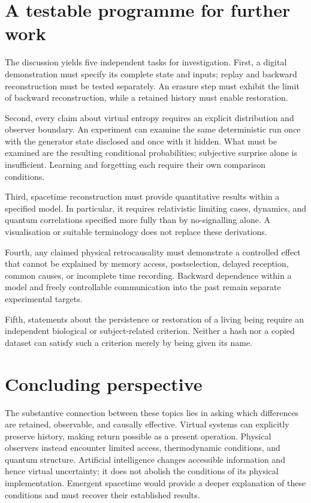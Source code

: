 \section{A testable programme for further work}\label{en:sec12}
The discussion yields five independent tasks for investigation. First, a digital demonstration must specify its complete state and inputs; replay and backward reconstruction must be tested separately. An erasure step must exhibit the limit of backward reconstruction, while a retained history must enable restoration.

Second, every claim about virtual entropy requires an explicit distribution and observer boundary. An experiment can examine the same deterministic run once with the generator state disclosed and once with it hidden. What must be examined are the resulting conditional probabilities; subjective surprise alone is insufficient. Learning and forgetting each require their own comparison conditions.

Third, spacetime reconstruction must provide quantitative results within a specified model. In particular, it requires relativistic limiting cases, dynamics, and quantum correlations specified more fully than by no-signalling alone. A visualisation or suitable terminology does not replace these derivations.

Fourth, any claimed physical retrocausality must demonstrate a controlled effect that cannot be explained by memory access, postselection, delayed reception, common causes, or incomplete time recording. Backward dependence within a model and freely controllable communication into the past remain separate experimental targets.

Fifth, statements about the persistence or restoration of a living being require an independent biological or subject-related criterion. Neither a hash nor a copied dataset can satisfy such a criterion merely by being given its name.

\section{Concluding perspective}\label{en:sec13}
The substantive connection between these topics lies in asking which differences are retained, observable, and causally effective. Virtual systems can explicitly preserve history, making return possible as a present operation. Physical observers instead encounter limited access, thermodynamic conditions, and quantum structure. Artificial intelligence changes accessible information and hence virtual uncertainty; it does not abolish the conditions of its physical implementation. Emergent spacetime would provide a deeper explanation of these conditions and must recover their established results.

